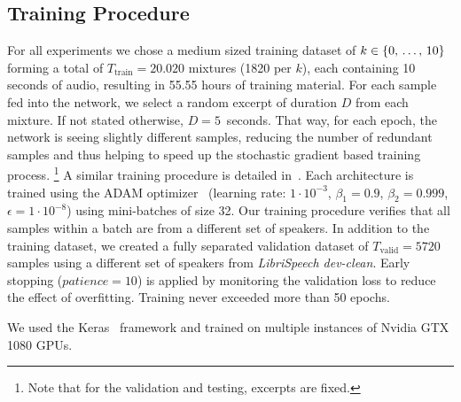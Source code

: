 \subsection{Training Procedure}%
\label{ssec:parameters}
For all experiments we chose a medium sized training dataset of \(k \in \textrm{\{0, \ldots, 10\}}\) forming a total of \(T_{\textrm{train}} = 20.020\) mixtures  (1820 per \(k\)), each containing 10 seconds of audio, resulting in 55.55 hours of training material.
For each sample fed into the network, we select a random excerpt of duration \(D\) from each mixture. If not stated otherwise, \(D=5\)~seconds.
That way, for each epoch, the network is seeing slightly different samples, reducing the number of redundant samples and thus helping to speed up the stochastic gradient based training process.
\footnote{Note that for the validation and testing, excerpts are fixed.}
A similar training procedure is detailed in~\cite{schluter16, stoeter17}.
Each architecture is trained using the ADAM optimizer~\cite{kingma14} (learning rate: \(1 \cdot 10^{-3}\), \(\beta_1=0.9\), \(\beta_2=0.999\), \(\epsilon=1 \cdot 10^{-8}\)) using mini-batches of size 32.
Our training procedure verifies that all samples within a batch are from a different set of speakers.
In addition to the training dataset, we created a fully separated validation dataset of \(T_{\textrm{valid}} = 5720\) samples using a different set of speakers from \emph{LibriSpeech dev-clean}.
Early stopping (\(patience = 10\)) is applied by monitoring the validation loss to reduce the effect of overfitting.
Training never exceeded more than 50 epochs.
\par
We used the Keras~\cite{chollet15} framework and trained on multiple instances of Nvidia GTX 1080 GPUs.

